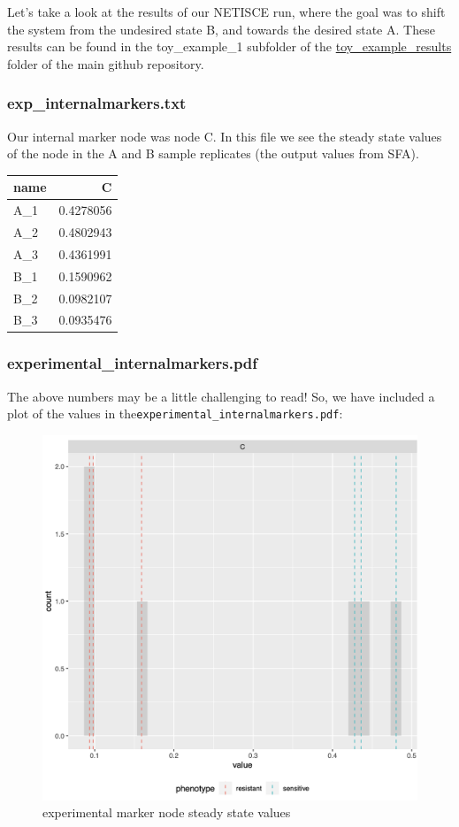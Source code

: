 \documentclass[
]{book}
\begin{document}
Let's take a look at the results of our NETISCE run, where the goal was to shift the system from the undesired state B, and towards the desired state A. These results can be found in the toy\_example\_1 subfolder of the \href{https://github.com/VeraLiconaResearchGroup/Netisce/tree/main/toy_example_results}{toy\_example\_results} folder of the main github repository.

\hypertarget{section-id}{%
\subsubsection*{exp\_internalmarkers.txt}\label{section-id}}

Our internal marker node was node C. In this file we see the steady state values of the node in the A and B sample replicates (the output values from SFA).

\begin{tabular}{l|r}
\hline
name & C\\
\hline
A\_1 & 0.4278056\\
\hline
A\_2 & 0.4802943\\
\hline
A\_3 & 0.4361991\\
\hline
B\_1 & 0.1590962\\
\hline
B\_2 & 0.0982107\\
\hline
B\_3 & 0.0935476\\
\hline
\end{tabular}

\hypertarget{section-id}{%
\subsubsection*{experimental\_internalmarkers.pdf}\label{section-id}}

The above numbers may be a little challenging to read! So, we have included a plot of the values in the\texttt{experimental\_internalmarkers.pdf}:

\begin{figure}

{\centering \includegraphics[width=0.5\linewidth]{images/expmarkers} 

}

\caption{experimental marker node steady state values}\label{fig:unnamed-chunk-10}
\end{figure}
\end{document}
